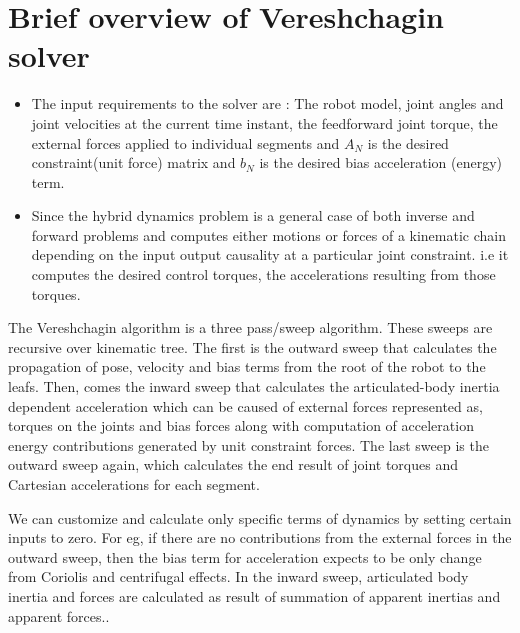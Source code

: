 \section{Brief overview of Vereshchagin solver}
\begin{itemize}
	\item The input requirements to the solver are : The robot model, joint angles and joint velocities at the current time instant, the feedforward joint torque, the external forces applied to individual segments and $A_{N}$ is the desired constraint(unit force) matrix and $b_{N}$ is the desired bias acceleration (energy) term.
	\item Since the hybrid dynamics problem is a general case of both inverse and forward problems and computes either motions or forces of a kinematic chain depending on the input output causality at a particular joint constraint. i.e it computes the desired control torques, the accelerations resulting from those torques. 
\end{itemize}
\par
The Vereshchagin algorithm is a three pass/sweep algorithm. These sweeps are recursive over kinematic tree. The first is the outward sweep that calculates the propagation of pose, velocity and bias terms from the root of the robot to the leafs. Then, comes the inward sweep that calculates the articulated-body inertia dependent acceleration which can be caused of external forces represented as, torques on the joints and bias forces along with computation of acceleration energy contributions generated by unit constraint forces. The last sweep is the outward sweep again, which calculates the end result of joint torques and Cartesian accelerations for each segment. 
\par 
We can customize and calculate only specific terms of dynamics by setting certain inputs to zero.\cite{featherstone2014rigid} For eg, if there are no contributions from the external forces in the outward sweep, then the bias term for acceleration expects to be only change from Coriolis and centrifugal effects.
In the inward sweep, articulated body inertia and forces are calculated as result of summation of apparent inertias and apparent forces.\cite{featherstone2014rigid}.

